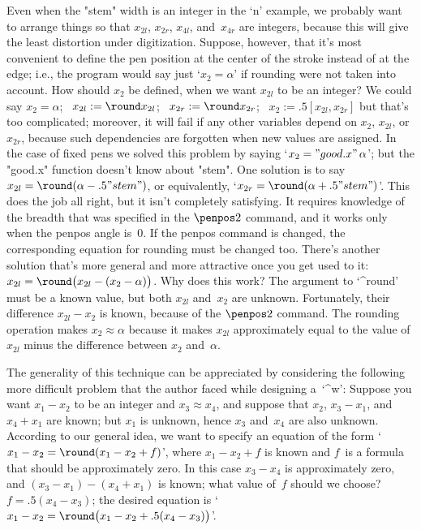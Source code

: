 \danger Even when the "stem" width is an integer in the `n' example,
we probably want to arrange things so that $x_{2l}$, $x_{2r}$, $x_{4l}$,
and~$x_{4r}$ are integers, because this will give the least distortion
under digitization. Suppose, however, that it's most convenient to define
the pen position at the center of the stroke instead of at the edge; i.e.,
the program would say just `$x_2=\alpha$' if rounding were not taken into
account. How should $x_2$ be defined, when we want $x_{2l}$ to be an
integer? We could say
\begindisplay
$x_2=\alpha$; \ $x_{2l}:=\round x_{2l}$; \ $x_{2r}:=\round x_{2r}$; \
$x_2:=.5[x_{2l},x_{2r}]$
\enddisplay
but that's too complicated; moreover, it will fail if any other
variables depend on $x_2$, $x_{2l}$, or $x_{2r}$, because such
dependencies are forgotten when new values are assigned.
In the case of fixed pens we solved this problem by saying
`$x_2="good.x"\,\alpha$'; but the "good.x" function doesn't know
about "stem". One solution is to say
\begindisplay
$x_{2l}=\round(\alpha-.5"stem")$,
\enddisplay
or equivalently, `$x_{2r}=\round(\alpha+.5"stem")$'. This does the
job all right, but it isn't completely satisfying. It requires
knowledge of the breadth that was specified in the $\penpos2$ command,
and it works only when the penpos angle is~0. If the penpos command
is changed, the corresponding equation for rounding must be
changed too. There's another solution that's more general and more
attractive once you get used to it:
\begindisplay
$x_{2l}=\round\bigl(x_{2l}-(x_2-\alpha)\bigr)$.
\enddisplay
Why does this work? The argument to `^{round}' must be a known value,
but both $x_{2l}$ and~$x_2$ are unknown. Fortunately, their difference
$x_{2l}-x_2$ is known, because of the $\penpos2$ command. The
rounding operation makes $x_2\approx\alpha$ because it makes $x_{2l}$
approximately equal to the value of $x_{2l}$ minus the difference
between $x_2$ and~$\alpha$.

\ddangerexercise The generality of this technique can be appreciated
by considering the following more difficult problem that the author
faced while designing a~`^{w}': Suppose you want $x_1-x_2$ to be
an integer and $x_3\approx x_4$, and suppose that $x_2$, $x_3-x_1$,
and~$x_4+x_1$ are known; but $x_1$ is unknown, hence $x_3$ and~$x_4$
are also unknown. According to our general idea, we want to specify an
equation of the form `$x_1-x_2=\round(x_1-x_2+f)$', where $x_1-x_2+f$
is known and $f$~is a formula that should be approximately zero.
In this case $x_3-x_4$ is approximately zero, and $(x_3-x_1)-(x_4+x_1)$
is known; what value of~$f$ should we choose?
\answer $f=.5(x_4-x_3)$; the desired equation is
`$x_1-x_2=\round\bigl(x_1-x_2+.5(x_4-x_3)\bigr)$'.

